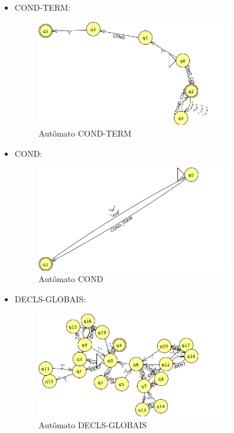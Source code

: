 \begin{itemize}
	\item COND-TERM:
	\begin{figure}[H]
		\centering 
		\includegraphics[width=0.8\textwidth]{images/submaquinas/COND-TERM.png}  
		\caption{Autômato COND-TERM}
	\end{figure}
	
	\item COND:
	\begin{figure}[H]
		\centering 
		\includegraphics[width=0.8\textwidth]{images/submaquinas/COND.png}  
		\caption{Autômato COND}
	\end{figure}
	
	\item DECLS-GLOBAIS:
	\begin{figure}[H]
		\centering 
		\includegraphics[width=0.8\textwidth]{images/submaquinas/DECLS-GLOBAIS.png}  
		\caption{Autômato DECLS-GLOBAIS}
	\end{figure}
	

\end{itemize}
